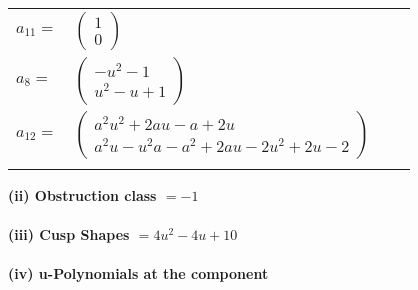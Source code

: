 \documentclass[1p]{elsarticle_modified}
\theoremstyle{definition}
\begin{document}
\begin{tabular}{m{7pt} m{180pt} m{7pt} m{180pt} }
\flushright $a_{11}=$&$\begin{pmatrix}1\\0\end{pmatrix}$ \\
\flushright $a_{8}=$&$\begin{pmatrix}- u^2-1\\u^2- u+1\end{pmatrix}$ \\
\flushright $a_{12}=$&$\begin{pmatrix}a^2 u^2+2 a u- a+2 u\\a^2 u- u^2 a- a^2+2 a u-2 u^2+2 u-2\end{pmatrix}$\\&\end{tabular}
\flushleft \textbf{(ii) Obstruction class $= -1$}\\~\\
\flushleft \textbf{(iii) Cusp Shapes $= 4 u^2-4 u+10$}\\~\\
\newpage\renewcommand{\arraystretch}{1}
\flushleft \textbf{(iv) u-Polynomials at the component}\newline \\
\end{document}
